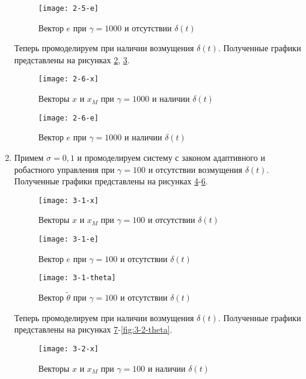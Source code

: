 \documentclass[14pt, a4paper]{extarticle}
\begin{document}
\begin{enumerate}
		\begin{figure}[H]
			\centering
			\texttt{[image: 2-5-e]}
			\caption{Вектор $e$ при $\gamma=1000$ и отсутствии $\delta(t)$}
			\label{fig:2-5-e}
		\end{figure}
		
		Теперь промоделируем при наличии возмущения $\delta(t)$. Полученные графики представлены на рисунках \ref{fig:2-6-x}, \ref{fig:2-6-e}.
		
		\begin{figure}[H]
			\centering
			\texttt{[image: 2-6-x]}
			\caption{Векторы $x$ и $x_M$ при $\gamma=1000$ и наличии $\delta(t)$}
			\label{fig:2-6-x}
		\end{figure}
		
		\begin{figure}[H]
			\centering
			\texttt{[image: 2-6-e]}
			\caption{Вектор $e$ при $\gamma=1000$ и наличии $\delta(t)$}
			\label{fig:2-6-e}
		\end{figure}
		
		\item Примем $\sigma=0,1$ и промоделируем систему с законом адаптивного и робастного управления при $\gamma=100$ и отсутствии возмущения $\delta(t)$. Полученные графики представлены на рисунках \ref{fig:3-1-x}-\ref{fig:3-1-theta}.
		
		\begin{figure}[H]
			\centering
			\texttt{[image: 3-1-x]}
			\caption{Векторы $x$ и $x_M$ при $\gamma=100$ и отсутствии $\delta(t)$}
			\label{fig:3-1-x}
		\end{figure}
		
		\begin{figure}[H]
			\centering
			\texttt{[image: 3-1-e]}
			\caption{Вектор $e$ при $\gamma=100$ и отсутствии $\delta(t)$}
			\label{fig:3-1-e}
		\end{figure}
		
		\begin{figure}[H]
			\centering
			\texttt{[image: 3-1-theta]}
			\caption{Вектор $\tilde{\theta}$ при $\gamma=100$ и отсутствии $\delta(t)$}
			\label{fig:3-1-theta}
		\end{figure}
		
		Теперь промоделируем при наличии возмущения $\delta(t)$. Полученные графики представлены на рисунках \ref{fig:3-2-x}-\ref{fig:3-2-theta}.
		
		\begin{figure}[H]
			\centering
			\texttt{[image: 3-2-x]}
			\caption{Векторы $x$ и $x_M$ при $\gamma=100$ и наличии $\delta(t)$}
			\label{fig:3-2-x}
		\end{figure}
		

\end{enumerate}
\end{document}
